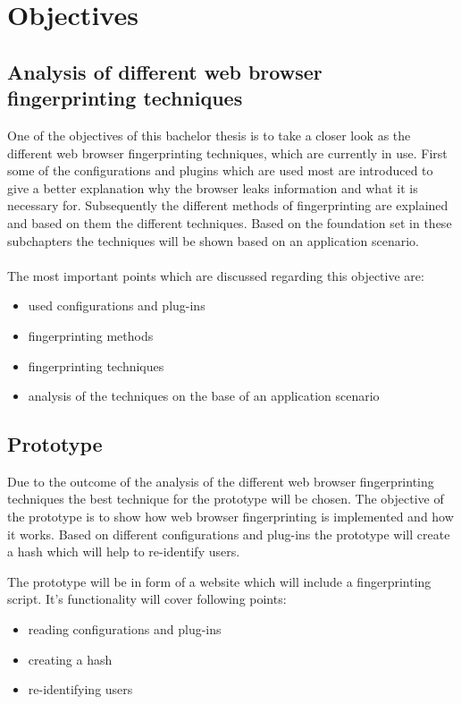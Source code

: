 \newpage
\section{Objectives}
\subsection{Analysis of different web browser fingerprinting techniques}
One of the objectives of this bachelor thesis is to take a closer look as the different web browser fingerprinting techniques, which are currently in use. 
First some of the configurations and plugins which are used most are introduced to give a better explanation why the browser leaks information and what it is necessary for. Subsequently the different methods of fingerprinting are explained and based on them the different techniques.
Based on the foundation set in these subchapters the techniques will be shown based on an application scenario. \\ 
\\
The most important points which are discussed regarding this objective are:
\begin{itemize}
	\item used configurations and plug-ins
	\item fingerprinting methods
	\item fingerprinting techniques
	\item analysis of the techniques on the base of an application scenario
\end{itemize}

\subsection{Prototype}
Due to the outcome of the analysis of the different web browser fingerprinting techniques the best technique for the prototype will be chosen. The objective of the prototype is to show how web browser fingerprinting is implemented and how it works. Based on different configurations and plug-ins the prototype will create a hash which will help to re-identify users.

The prototype will be in form of a website which will include a fingerprinting script. It's functionality will cover following points:
\begin{itemize}
	\item reading configurations and plug-ins
	\item creating a hash
	\item re-identifying users
\end{itemize}

